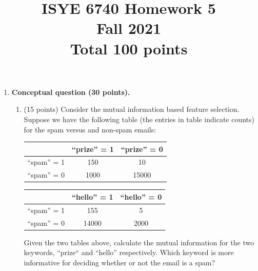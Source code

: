 \documentclass[twoside,10pt]{article}
\begin{document}
\title{ISYE 6740 Homework 5\\ 
Fall 2021\\ 
\small Total 100 points}
\date{}
\maketitle






\begin{enumerate}

\item {\bf Conceptual question (30 points).} 

\begin{enumerate}

\item (15 points) Consider the mutual information based feature selection. Suppose we have the following table (the entries in table indicate counts) for the spam versus and non-spam emails:
%
\begin{center}
\begin{tabular}{c|c|c}
\hline
& ``prize'' = 1 & ``prize'' = 0 \\\hline
``spam'' = 1 & 150& 10 \\ \hline 
 ``spam'' = 0 & 1000 & 15000  \\\hline
\end{tabular}
\end{center}

\begin{center}
\begin{tabular}{c|c|c}
\hline
& ``hello'' = 1 & ``hello'' = 0 \\\hline
``spam'' = 1 & 155 & 5 \\ \hline 
 ``spam'' = 0 & 14000 & 2000  \\\hline
\end{tabular}
\end{center}

Given the two tables above, calculate the mutual information for the two keywords, ``prize`` and ``hello'' respectively. Which keyword is more informative for deciding whether or not the email is a spam?


\end{enumerate}
\end{enumerate}
\end{document}
